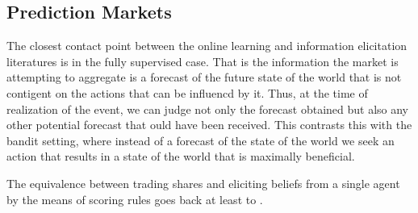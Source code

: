 


\subsection{Prediction Markets} 

The closest contact point between the online learning and information elicitation literatures is in the fully supervised case.
That is the information the market is attempting to aggregate is a forecast of the future state of the world that is not contigent on the actions that can be influencd by it. Thus, at the time of realization of the event, we can judge not only the forecast obtained but also any other potential forecast that ould have been received. 
This contrasts this with the bandit setting, where instead of a forecast of the state of the world we seek an action that results in a state of the world that is maximally beneficial.  


The equivalence between trading shares and eliciting beliefs from a single agent by the means of scoring rules goes back at least to \cite{savage1971elicitation}. 



